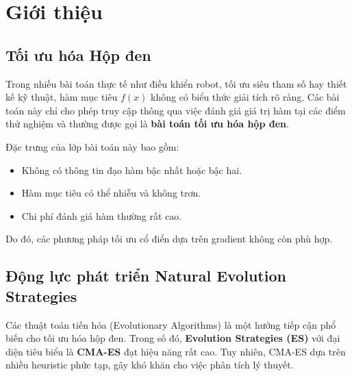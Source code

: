 \documentclass[12pt, a4paper]{article}
\begin{document}
	\begin{abstract}
		Natural Evolution Strategies (NES) là một lớp thuật toán tối ưu hóa hộp đen dựa trên việc tối ưu hóa trực tiếp các tham số của phân phối tìm kiếm. Khác với các phương pháp tiến hóa truyền thống vốn phụ thuộc nhiều vào heuristic, NES được xây dựng trên nền tảng toán học chặt chẽ của \emph{Natural Gradient} và hình học thông tin.  
		
		Báo cáo này trình bày cơ sở lý thuyết của NES, phân tích nguyên nhân khiến Gradient thông thường trở nên mất ổn định khi áp dụng cho phân phối Gaussian, và giới thiệu biến thể \textbf{xNES (Exponential NES)} nhằm khắc phục các hạn chế về tính ổn định số và chi phí tính toán. Các thực nghiệm trên hàm Rastrigin cho thấy xNES đạt khả năng hội tụ ổn định và hiệu quả, tương đương với các phương pháp hiện đại như CMA-ES.
	\end{abstract}
	
	\section{Giới thiệu}
	
	\subsection{Tối ưu hóa Hộp đen}
	Trong nhiều bài toán thực tế như điều khiển robot, tối ưu siêu tham số hay thiết kế kỹ thuật, hàm mục tiêu $f(x)$ không có biểu thức giải tích rõ ràng. Các bài toán này chỉ cho phép truy cập thông qua việc đánh giá giá trị hàm tại các điểm thử nghiệm và thường được gọi là \textbf{bài toán tối ưu hóa hộp đen}.  
	
	Đặc trưng của lớp bài toán này bao gồm:
	\begin{itemize}
		\item Không có thông tin đạo hàm bậc nhất hoặc bậc hai.
		\item Hàm mục tiêu có thể nhiễu và không trơn.
		\item Chi phí đánh giá hàm thường rất cao.
	\end{itemize}
	
	Do đó, các phương pháp tối ưu cổ điển dựa trên gradient không còn phù hợp.
	
	\subsection{Động lực phát triển Natural Evolution Strategies}
	Các thuật toán tiến hóa (Evolutionary Algorithms) là một hướng tiếp cận phổ biến cho tối ưu hóa hộp đen. Trong số đó, \textbf{Evolution Strategies (ES)} với đại diện tiêu biểu là \textbf{CMA-ES} đạt hiệu năng rất cao. Tuy nhiên, CMA-ES dựa trên nhiều heuristic phức tạp, gây khó khăn cho việc phân tích lý thuyết.
	
\end{document}
